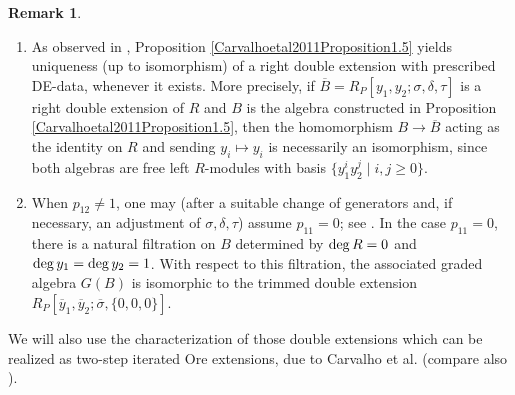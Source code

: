 \documentclass{amsart}
\theoremstyle{definition}
\newtheorem{remark}[theorem]{Remark}
\theoremstyle{remark}
\numberwithin{equation}{section}
\begin{document}
\begin{remark}
\begin{enumerate}
    \item[\rm (i)] As observed in \cite[Remark 1.6]{Carvalhoetal2011}, Proposition \ref{Carvalhoetal2011Proposition1.5} yields uniqueness (up to isomorphism) of a right double extension with prescribed DE-data, whenever it exists. More precisely, if $\overline{B}=R_P[y_1,y_2;\sigma,\delta,\tau]$ is a right double extension of $R$ and $B$ is the algebra constructed in Proposition \ref{Carvalhoetal2011Proposition1.5}, then the homomorphism $B\to\overline{B}$ acting as the identity on $R$ and sending $y_i\mapsto y_i$ is necessarily an isomorphism, since both algebras are free left $R$-modules with basis $\{y_1^iy_2^j\mid i,j\ge 0\}$.

    \item[\rm (ii)] When $p_{12}\neq 1$, one may (after a suitable change of generators and, if necessary, an adjustment of $\sigma,\delta,\tau$) assume $p_{11}=0$; see \cite[p. 2842]{Carvalhoetal2011}. In the case $p_{11}=0$, there is a natural filtration on $B$ determined by ${\rm deg}\,R=0$ and ${\rm deg}\,y_1={\rm deg}\,y_2=1$. With respect to this filtration, the associated graded algebra $G(B)$ is isomorphic to the trimmed double extension $R_P[\overline{y}_1,\overline{y}_2;\overline{\sigma},\{0,0,0\}]$.
\end{enumerate}
\end{remark}

We will also use the characterization of those double extensions which can be realized as two-step iterated Ore extensions, due to Carvalho et al. \cite{Carvalhoetal2011} (compare also \cite[Proposition 3.6]{ZhangZhang2009}).
\end{document}
